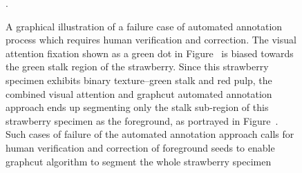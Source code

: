 \documentclass {udthesis}
\begin{document}
\begin{figure}
\begin{subfigure}[]{0.2\textwidth}
      \caption{}
      \label{fig:bad_seg_recursive_seg}
  \end{subfigure}
\caption[Illustration of failed automated annotation process flow]{A graphical illustration of a failure case of automated annotation process which requires human verification and correction. The visual attention fixation shown as a green dot in Figure~ is biased towards the green stalk region of the strawberry. Since this strawberry specimen exhibits binary texture--green stalk and red pulp, the combined visual attention and graphcut automated annotation approach ends up segmenting only the stalk sub-region of this strawberry specimen as the foreground, as portrayed in Figure~. Such cases of failure of the automated annotation approach calls for human verification and correction of foreground seeds to enable graphcut algorithm to segment the whole strawberry specimen}. 
\label{fig:annotation_bad_seg}
\end{figure}	
%
\end{document}
